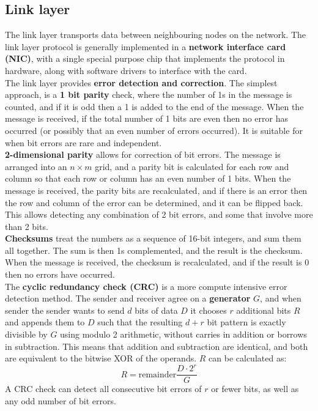 \subsection{Link layer}
The link layer transports data between neighbouring nodes on the network. The link layer protocol is generally implemented in a \textbf{network interface card (NIC)}, with a single special purpose chip that implements the protocol in hardware, along with software drivers to interface with the card.\\
The link layer provides \textbf{error detection and correction}. The simplest approach, is a \textbf{1 bit parity} check, where the number of 1s in the message is counted, and if it is odd then a 1 is added to the end of the message. When the message is received, if the total number of 1 bits are even then no error has occurred (or possibly that an even number of errors occurred). It is suitable for when bit errors are rare and independent.\\
\textbf{2-dimensional parity} allows for correction of bit errors. The message is arranged into an $n\times m$ grid, and a parity bit is calculated for each row and column so that each row or column has an even number of 1 bits. When the message is received, the parity bits are recalculated, and if there is an error then the row and column of the error can be determined, and it can be flipped back. This allows detecting any combination of 2 bit errors, and some that involve more than 2 bits.\\
\textbf{Checksums} treat the numbers as a sequence of 16-bit integers, and sum them all together. The sum is then 1s complemented, and the result is the checksum. When the message is received, the checksum is recalculated, and if the result is 0 then no errors have occurred.\\
The \textbf{cyclic redundancy check (CRC)} is a more compute intensive error detection method. The sender and receiver agree on a \textbf{generator} $G$, and when sender the sender wants to send $d$ bits of data $D$ it chooses $r$ additional bits $R$ and appends them to $D$ such that the resulting $d+r$ bit pattern is exactly divisible by $G$ using modulo 2 arithmetic, without carries in addition or borrows in subtraction. This means that addition and subtraction are identical, and both are equivalent to the bitwise XOR of the operands. $R$ can be calculated as:
\[
	R=\text{remainder}\frac{D\cdot2^r}{G}
\]
A CRC check can detect all consecutive bit errors of $r$ or fewer bits, as well as any odd number of bit errors.


